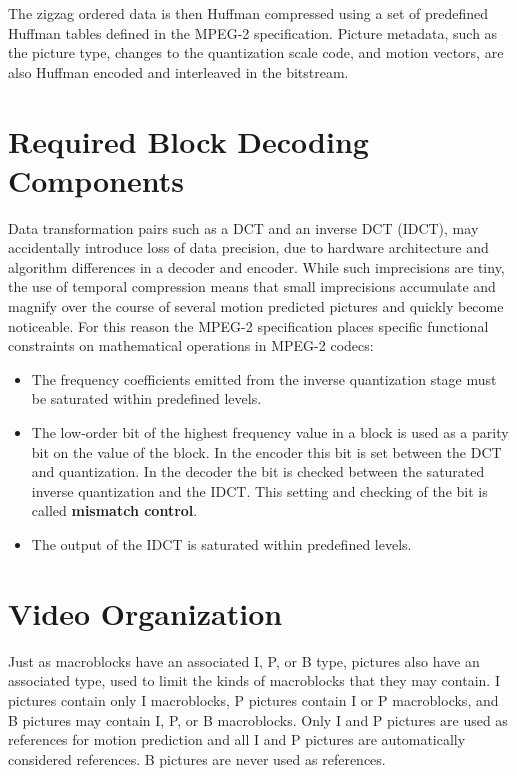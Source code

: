 The zigzag ordered data is then Huffman compressed using 
a set of predefined Huffman tables defined in the MPEG-2 
specification. Picture metadata, such as the picture type, changes
to the quantization scale code, and motion vectors,
are also Huffman encoded and interleaved in the bitstream.

\section{Required Block Decoding Components}
\label{subsection:extra_decoder}

Data transformation pairs such as a DCT and an inverse DCT (IDCT), may accidentally
introduce loss of data precision, 
due to hardware architecture and algorithm differences 
in a decoder and encoder.
While such imprecisions are tiny, the use of temporal compression
means that small imprecisions accumulate and magnify over the course
of several motion predicted pictures and quickly become noticeable.
For this reason the MPEG-2 specification places specific functional constraints on
mathematical operations in MPEG-2 codecs: 

\begin{itemize}
\item The frequency coefficients emitted from the inverse quantization stage must be saturated within predefined levels.
\item The low-order bit of the highest frequency value in a block is used as a parity bit on the value of the block. In the encoder this bit is set between the DCT and quantization. In the decoder the bit is checked between the saturated inverse quantization and the IDCT. This setting and checking of the bit is called \textbf{mismatch control}.
\item The output of the IDCT is saturated within predefined levels.  
\end{itemize}

\section{Video Organization}

\label{subsection:pic_org}

Just as macroblocks have an associated I, P, or B type, 
pictures also have an associated type, used to 
limit the kinds of macroblocks that they may contain. I pictures 
contain only I macroblocks, P pictures contain I or P macroblocks, 
and B pictures may contain I, P, or B macroblocks. Only I and P 
pictures are used as references for motion prediction and
all I and P pictures are automatically considered references. 
B pictures are never used as references. 

